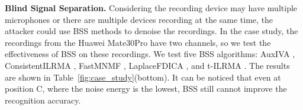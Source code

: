 \textbf{Blind Signal Separation.}
Considering the recording device may have multiple microphones or there are multiple devices recording at the same time, the attacker could use BSS methods to denoise the recordings. In the case study, the recordings from the Huawei Mate30Pro have two channels, so we test the effectiveness of BSS on these recordings. We test five BSS algorithms: AuxIVA \cite{AuxIVA}, ConsistentILRMA \cite{consistentILRMA}, FastMNMF \cite{fastMNMF}, LaplaceFDICA \cite{fdica}, and t-ILRMA \cite{ilrma}. The results are shown in Table~\ref{fig:case_study}(bottom). It can be noticed that even at position C, where the noise energy is the lowest, BSS still cannot improve the recognition accuracy.